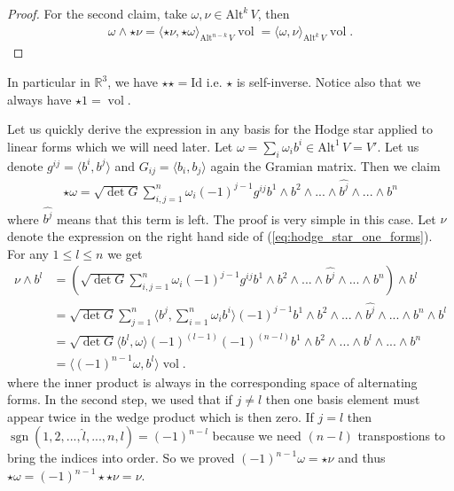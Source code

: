 \documentclass[12pt,a4paper]{article}
\numberwithin{equation}{subsection}
\numberwithin{lemma}{subsection}
\theoremstyle{definition}
\DeclareMathOperator{\sgn}{sgn}
\DeclareMathOperator{\vol}{vol}
\newcommand{\alternating}[2]{ {\text{Alt}^{#1}\,#2} }
\newcommand{\real}{\mathbb{R}}
\begin{document}
\begin{proof}
    For the second claim, take $\omega, \nu \in \alternating{k}{V}$, then
    \begin{align*}
        \omega \wedge \star \nu = \langle \star \nu , \star \omega \rangle _{\alternating{n-k}{V}} \vol
        = \langle \omega , \nu \rangle _{\alternating{k}{V}} \vol.
    \end{align*}
\end{proof}
In particular in $\real^3$, we have 
$\star\star = \text{Id}$ i.e. $\star$ is self-inverse. Notice also 
that we always have $\star 1 = \vol$.

Let us quickly derive the expression in any basis 
for the Hodge star applied to linear 
forms which we will need later. Let $\omega = \sum_i \omega_i b^i \in 
\alternating{1}{V} = V'$. Let us denote $g^{ij} = \langle b^i, b^j \rangle$ 
and $G_{ij} = \langle b_i, b_j \rangle$ again the Gramian matrix.
Then we claim
\begin{align}
    \star \omega = \sqrt{\det G} \sum_{i,j=1}^n \omega_i (-1)^{j-1} 
        g^{ij} b^1 \wedge
        b^2 \wedge ... \wedge \widehat{b^j}\wedge ... \wedge b^n 
        \label{eq:hodge_star_one_forms}
\end{align}
where $\widehat{b^j}$ means that this term is left. The proof is very 
simple in this case. Let $\nu$ denote the expression on the right hand side 
of (\ref{eq:hodge_star_one_forms}).
For any $1 \leq l \leq n$ we get
\begin{align*}
    \nu \wedge b^l &= \left( \sqrt{\det G} \sum_{i,j=1}^n \omega_i (-1)^{j-1} g^{ij} b^1 \wedge
        b^2 \wedge ... \wedge \widehat{b^j} \wedge ... \wedge b^n\right) \wedge b^l 
    \\ &= \sqrt{\det G} \sum_{j=1}^n \langle b^j,\sum_{i=1}^n \omega_i  b^i\rangle
        (-1)^{j-1}  b^1 \wedge
        b^2 \wedge ... \wedge \widehat{b^j} \wedge ... \wedge b^n \wedge b^l
    \\ &= \sqrt{\det G} \langle b^l,\omega \rangle
        (-1)^{(l-1)}(-1)^{(n-l)}  b^1 \wedge
        b^2 \wedge ... \wedge b^l  \wedge ... \wedge b^n 
    \\ &= \langle (-1)^{n-1}\omega, b^l \rangle \vol.
\end{align*}
where the inner product is always in the corresponding space of alternating forms.
In the second step, we used that if $j\neq l$ then one basis element must 
appear twice in the wedge product which is then zero. If $j=l$ then 
$\sgn (1,2, ..., \hat{l},...,n,l) = (-1)^{n-l}$ because we need $(n-l)$
transpostions to bring the indices into order. So we proved 
$(-1)^{n-1}\omega = \star \nu$ and thus $\star \omega = (-1)^{n-1} \star\star\nu = \nu$.
\end{document}
